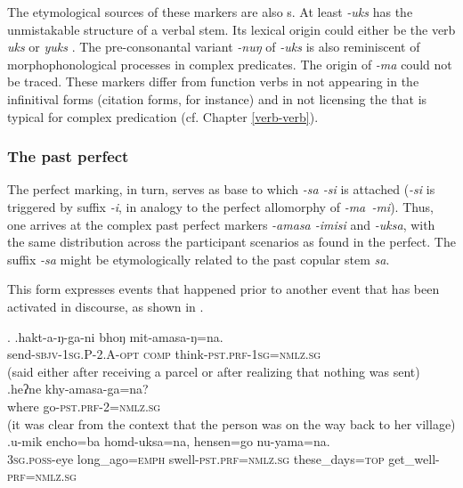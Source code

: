 The etymological sources of these markers are also s. At least \emph{-uks} has the unmistakable structure of a verbal stem. Its lexical origin could either be the verb \emph{uks}  or \emph{yuks} . The pre-consonantal variant \emph{-nuŋ} of \emph{-uks} is also reminiscent of morphophonological processes in complex predicates. The origin of \emph{-ma} could not be traced. These markers differ from function verbs in not appearing in the infinitival forms (citation forms, for instance) and in not licensing the  that is typical for complex predication (cf. Chapter \ref{verb-verb}). 

	
\subsubsection{The past perfect}\label{pstprf}
	
The perfect marking, in turn, serves as base to which \emph{-sa \ti -si} is attached (\emph{-si} is triggered by suffix \emph{-i}, in analogy to the perfect allomorphy of \mbox{\emph{-ma \ti -mi}}). Thus, one arrives at the complex past perfect markers \emph{-amasa \ti -imisi} and  \emph{-uksa}, with the same distribution across the participant scenarios as found in the perfect. The suffix \emph{-sa} might be etymologically related to the past copular stem \emph{sa}. 

This  form expresses events that happened prior to another event that has been activated in discourse, as shown in \Next.

\ex. \ag.hakt-a-ŋ-ga-ni bhoŋ mit-amasa-ŋ=na.\\
send{\scshape -sbjv-1sg.P-2.A-opt} {\scshape comp} think{\scshape -pst.prf-1sg=nmlz.sg}\\
 (said \mbox{either} after receiving a parcel or after realizing that nothing was sent)
\bg.heʔne khy-amasa-ga=na?\\
where go{\scshape -pst.prf-2=nmlz.sg}\\
 (it was clear from the context that the person was on the way back to her village) 
	\bg.u-mik encho=ba homd-uksa=na, hensen=go nu-yama=na.\\
		{\scshape 3sg.poss-}eye long\_ago{\scshape =emph} swell{\scshape -pst.prf=nmlz.sg} these\_days{\scshape =top} get\_well{\scshape -prf=nmlz.sg}\\
		
